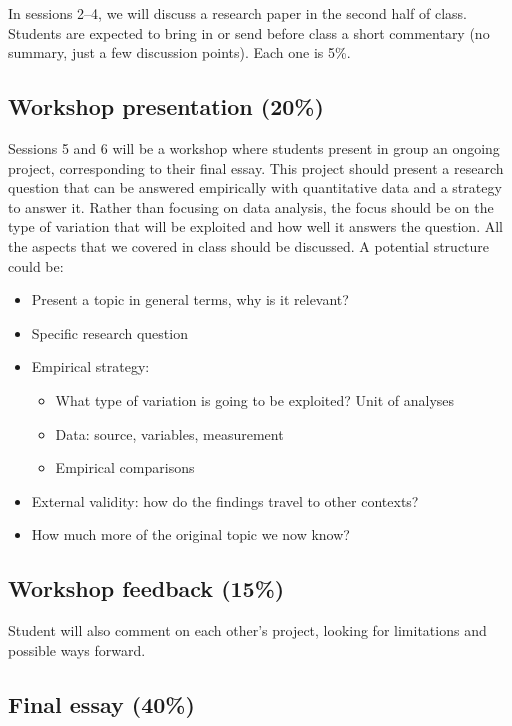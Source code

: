 \documentclass[12pt, a4paper]{article}
\begin{document}
In sessions 2--4, we will discuss a research paper in the second half of class. Students are expected to bring in or send before class a short commentary (no summary, just a few discussion points). Each one is 5\%.

\subsection*{Workshop presentation (20\%)}

Sessions 5 and 6 will be a workshop where students present in group an ongoing project, corresponding to their final essay. This project should present a research question that can be answered empirically with quantitative data and a strategy to answer it. Rather than focusing on data analysis, the focus should be on the type of variation that will be exploited and how well it answers the question. All the aspects that we covered in class should be discussed. A potential structure could be:

\begin{itemize}
\setlength\itemsep{-5pt}
  \item Present a topic in general terms, why is it relevant?
  \item Specific research question
  \item Empirical strategy:
  \vspace{-10pt}
  \begin{itemize}
  \setlength\itemsep{-5pt}
    \item What type of variation is going to be exploited? Unit of analyses
    \item Data: source, variables, measurement
    \item Empirical comparisons
  \end{itemize}
  \item External validity: how do the findings travel to other contexts?
  \item How much more of the original topic we now know?
\end{itemize}

\subsection*{Workshop feedback (15\%)}

Student will also comment on each other's project, looking for limitations and possible ways forward.

\subsection*{Final essay (40\%)}
\end{document}
